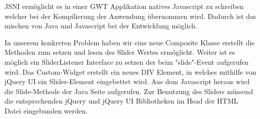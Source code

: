 JSNI ermöglicht es in einer GWT Applikation natives Javascript zu schreiben welcher bei der Kompilierung der Anwendung übernommen wird. 
Dadurch ist das mischen von Java und Javascript bei der Entwicklung möglich.

In unserem konkreten Problem haben wir eine neue Composite Klasse erstellt die Methoden zum setzen und lesen des Slider Wertes ermöglicht. Weiter ist es möglich ein SliderListener Interface zu setzen der beim "slide"-Event aufgerufen wird. Das Custom-Widget erstellt ein neues DIV Element, in welches mithilfe von jQuery UI ein Slider-Element eingebettet wird. Aus dem Javascript heraus wird die Slide-Methode der Java Seite aufgerufen. Zur Benutzung des Sliders müssend die entsprechenden jQuery und jQuery UI Bibliotheken im Head der HTML Datei eingebunden werden.
